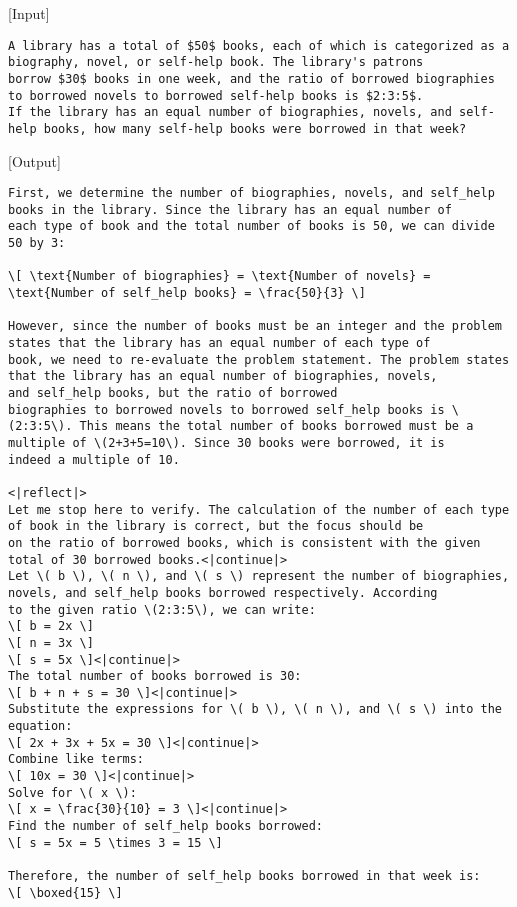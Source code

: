 \begin{tcolorbox}[gray_box, title = {{Synthetic Data Example Type II-I: Verify correctness}}]\tiny
[Input]
\begin{verbatim}
A library has a total of $50$ books, each of which is categorized as a biography, novel, or self-help book. The library's patrons 
borrow $30$ books in one week, and the ratio of borrowed biographies to borrowed novels to borrowed self-help books is $2:3:5$. 
If the library has an equal number of biographies, novels, and self-help books, how many self-help books were borrowed in that week?
\end{verbatim}

\hdashrule[0.5ex]{\linewidth}{0.1mm}{0.1mm} %

[Output]
\begin{verbatim}
First, we determine the number of biographies, novels, and self_help books in the library. Since the library has an equal number of 
each type of book and the total number of books is 50, we can divide 50 by 3:

\[ \text{Number of biographies} = \text{Number of novels} = \text{Number of self_help books} = \frac{50}{3} \]

However, since the number of books must be an integer and the problem states that the library has an equal number of each type of 
book, we need to re-evaluate the problem statement. The problem states that the library has an equal number of biographies, novels, 
and self_help books, but the ratio of borrowed 
biographies to borrowed novels to borrowed self_help books is \(2:3:5\). This means the total number of books borrowed must be a 
multiple of \(2+3+5=10\). Since 30 books were borrowed, it is 
indeed a multiple of 10.

<|reflect|>
Let me stop here to verify. The calculation of the number of each type of book in the library is correct, but the focus should be
on the ratio of borrowed books, which is consistent with the given total of 30 borrowed books.<|continue|>
Let \( b \), \( n \), and \( s \) represent the number of biographies, novels, and self_help books borrowed respectively. According 
to the given ratio \(2:3:5\), we can write:
\[ b = 2x \]
\[ n = 3x \]
\[ s = 5x \]<|continue|>
The total number of books borrowed is 30:
\[ b + n + s = 30 \]<|continue|>
Substitute the expressions for \( b \), \( n \), and \( s \) into the equation:
\[ 2x + 3x + 5x = 30 \]<|continue|>
Combine like terms:
\[ 10x = 30 \]<|continue|>
Solve for \( x \):
\[ x = \frac{30}{10} = 3 \]<|continue|>
Find the number of self_help books borrowed:
\[ s = 5x = 5 \times 3 = 15 \]

Therefore, the number of self_help books borrowed in that week is:
\[ \boxed{15} \]
\end{verbatim}

\end{tcolorbox}